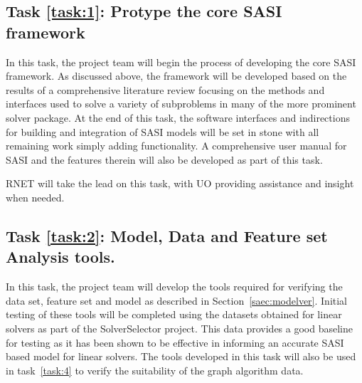 %

\setcounter{taskCount}{0}

\label{task:1}
\subsection{Task \ref{task:1}: Protype the core SASI framework}
In this task, the project team will begin the process of developing the core SASI framework. As discussed above, the framework
will be developed based on the results of a comprehensive literature review focusing on the methods 
and interfaces used to solve a variety of subproblems in many of the more prominent solver package.
At the end of this task, the software interfaces and indirections for building and integration of SASI models 
will be set in stone with all remaining work simply adding functionality. A comprehensive user manual for SASI and
the features therein will also be developed as part of this task. 

RNET will take the lead on this task, with UO providing assistance and insight when needed. 

\label{task:2}
\subsection{Task \ref{task:2}: Model, Data and Feature set Analysis tools. }
In this task, the project team will develop the tools required for verifying the data set, feature set and model as described in Section~\ref{saec:modelver}. Initial testing of these tools will be completed using the datasets obtained for linear solvers as part of the SolverSelector 
project. This data provides a good baseline for testing as it has been shown to be effective in informing an accurate SASI based model for linear solvers. The tools developed in this task will also be used in task~\ref{task:4} to verify the suitability of the graph algorithm data. 

